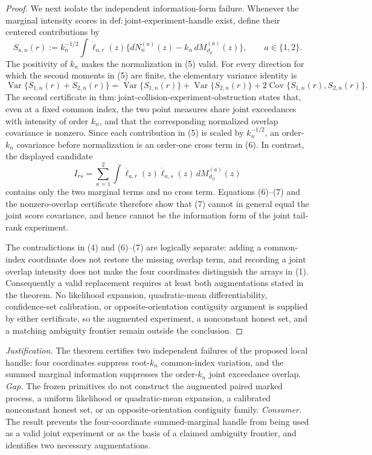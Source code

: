 \documentclass{article}
\begin{document}
\begin{proof}
We next isolate the independent information-form failure.  Whenever the marginal intensity scores in \(\mathrm{def{:}joint\text{-}experiment\text{-}handle}\) exist, define their centered contributions by
\[
 S_{a,n}(r)
 :=k_n^{-1/2}\int\dot\ell_{a,r}(z)
 \{dN_n^{(a)}(z)-k_n\,dM_{\vartheta_0}^{(a)}(z)\},
 \qquad a\in\{1,2\}.
 \tag{5}
\]
The positivity of \(k_n\) makes the normalization in (5) valid.  For every direction for which the second moments in (5) are finite, the elementary variance identity is
\[
 \operatorname{Var}\{S_{1,n}(r)+S_{2,n}(r)\}
 =\operatorname{Var}\{S_{1,n}(r)\}
 +\operatorname{Var}\{S_{2,n}(r)\}
 +2\operatorname{Cov}\{S_{1,n}(r),S_{2,n}(r)\}.
 \tag{6}
\]
The second certificate in \(\mathrm{thm{:}joint\text{-}collision\text{-}experiment\text{-}obstruction}\) states that, even at a fixed common index, the two point measures share joint exceedances with intensity of order \(k_n\), and that the corresponding normalized overlap covariance is nonzero.  Since each contribution in (5) is scaled by \(k_n^{-1/2}\), an order-\(k_n\) covariance before normalization is an order-one cross term in (6).  In contrast, the displayed candidate
\[
 I_{rs}=\sum_{a=1}^2\int\dot\ell_{a,r}(z)\dot\ell_{a,s}(z)\,dM_{\vartheta_0}^{(a)}(z)
 \tag{7}
\]
contains only the two marginal terms and no cross term.  Equations (6)--(7) and the nonzero-overlap certificate therefore show that (7) cannot in general equal the joint score covariance, and hence cannot be the information form of the joint tail-rank experiment.

The contradictions in (4) and (6)--(7) are logically separate: adding a common-index coordinate does not restore the missing overlap term, and recording a joint overlap intensity does not make the four coordinates distinguish the arrays in (1).  Consequently a valid replacement requires at least both augmentations stated in the theorem.  No likelihood expansion, quadratic-mean differentiability, confidence-set calibration, or opposite-orientation contiguity argument is supplied by either certificate, so the augmented experiment, a nonconstant honest set, and a matching ambiguity frontier remain outside the conclusion.
\end{proof}
\par\smallskip\noindent \textit{Justification.} The theorem certifies two independent failures of the proposed local handle: four coordinates suppress root-\(k_n\) common-index variation, and the summed marginal information suppresses the order-\(k_n\) joint exceedance overlap. \textit{Gap.} The frozen primitives do not construct the augmented paired marked process, a uniform likelihood or quadratic-mean expansion, a calibrated nonconstant honest set, or an opposite-orientation contiguity family. \textit{Consumer.} The result prevents the four-coordinate summed-marginal handle from being used as a valid joint experiment or as the basis of a claimed ambiguity frontier, and identifies two necessary augmentations.
\end{document}
